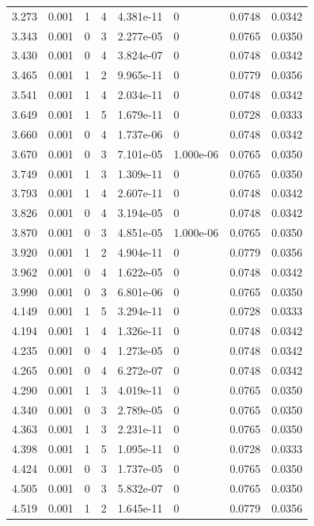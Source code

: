 \documentclass[preview]{standalone}
\begin{document}
{{{\begin{tabular}{L{1.2cm}C{1.2cm} C{0.3cm}C{0.5cm} C{1.4cm}C{1.4cm} C{1.4cm}C{1.4cm}}
  3.273  &  0.001  & 1     &  4 &  4.381e-11  & 0  & 0.0748 &  0.0342   \\ 
  3.343  &  0.001  & 0     &  3 &  2.277e-05  & 0  & 0.0765 &  0.0350   \\ 
  3.430  &  0.001  & 0     &  4 &  3.824e-07  & 0  & 0.0748 &  0.0342   \\ 
  3.465  &  0.001  & 1     &  2 &  9.965e-11  & 0  & 0.0779 &  0.0356   \\ 
  3.541  &  0.001  & 1     &  4 &  2.034e-11  & 0  & 0.0748 &  0.0342   \\ 
  3.649  &  0.001  & 1     &  5 &  1.679e-11  & 0  & 0.0728 &  0.0333   \\ 
  3.660  &  0.001  & 0     &  4 &  1.737e-06  & 0  & 0.0748 &  0.0342   \\ 
  3.670  &  0.001  & 0     &  3 &  7.101e-05  & 1.000e-06  & 0.0765 &  0.0350   \\ 
  3.749  &  0.001  & 1     &  3 &  1.309e-11  & 0  & 0.0765 &  0.0350   \\ 
  3.793  &  0.001  & 1     &  4 &  2.607e-11  & 0  & 0.0748 &  0.0342   \\ 
  3.826  &  0.001  & 0     &  4 &  3.194e-05  & 0  & 0.0748 &  0.0342   \\ 
  3.870  &  0.001  & 0     &  3 &  4.851e-05  & 1.000e-06  & 0.0765 &  0.0350   \\ 
  3.920  &  0.001  & 1     &  2 &  4.904e-11  & 0  & 0.0779 &  0.0356   \\ 
  3.962  &  0.001  & 0     &  4 &  1.622e-05  & 0  & 0.0748 &  0.0342   \\ 
  3.990  &  0.001  & 0     &  3 &  6.801e-06  & 0  & 0.0765 &  0.0350   \\ 
  4.149  &  0.001  & 1     &  5 &  3.294e-11  & 0  & 0.0728 &  0.0333   \\ 
  4.194  &  0.001  & 1     &  4 &  1.326e-11  & 0  & 0.0748 &  0.0342   \\ 
  4.235  &  0.001  & 0     &  4 &  1.273e-05  & 0  & 0.0748 &  0.0342   \\ 
  4.265  &  0.001  & 0     &  4 &  6.272e-07  & 0  & 0.0748 &  0.0342   \\ 
  4.290  &  0.001  & 1     &  3 &  4.019e-11  & 0  & 0.0765 &  0.0350   \\ 
  4.340  &  0.001  & 0     &  3 &  2.789e-05  & 0  & 0.0765 &  0.0350   \\ 
  4.363  &  0.001  & 1     &  3 &  2.231e-11  & 0  & 0.0765 &  0.0350   \\ 
  4.398  &  0.001  & 1     &  5 &  1.095e-11  & 0  & 0.0728 &  0.0333   \\ 
  4.424  &  0.001  & 0     &  3 &  1.737e-05  & 0  & 0.0765 &  0.0350   \\ 
  4.505  &  0.001  & 0     &  3 &  5.832e-07  & 0  & 0.0765 &  0.0350   \\ 
  4.519  &  0.001  & 1     &  2 &  1.645e-11  & 0  & 0.0779 &  0.0356   \\ 
\hline 
\end{tabular} 

}}}
\end{document}
